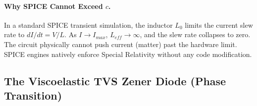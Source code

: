 \paragraph{Why SPICE Cannot Exceed $c$.}
In a standard SPICE transient simulation, the inductor $L_0$ limits the current slew rate to $dI/dt = V/L$. As $I \to I_{max}$, $L_{eff} \to \infty$, and the slew rate collapses to zero. The circuit physically cannot push current (matter) past the hardware limit. SPICE engines natively enforce Special Relativity without any code modification.

\subsection{The Viscoelastic TVS Zener Diode (Phase Transition)}

